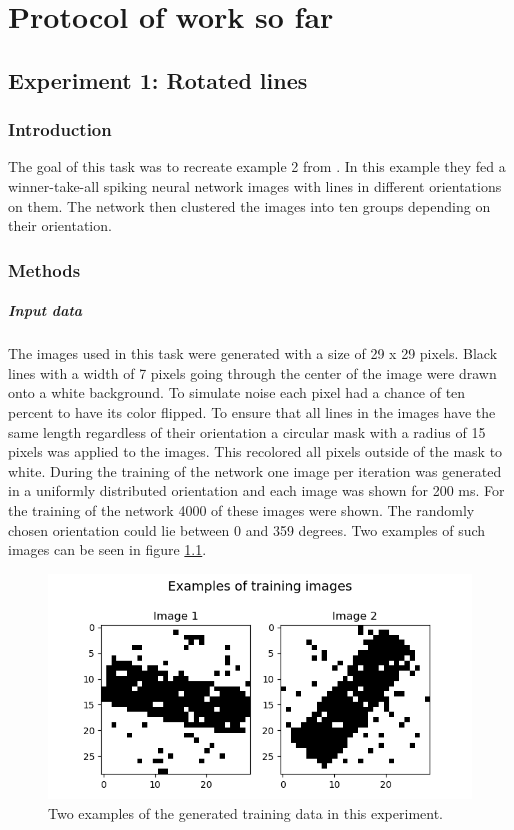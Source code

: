\chapter{Protocol of work so far}
\section{Experiment 1: Rotated lines}

\subsection{Introduction}
The goal of this task was to recreate example 2 from \citet{nessler}. In this example they fed a winner-take-all spiking neural network images with lines in different orientations on them. The network then clustered the images into ten groups depending on their orientation.

\subsection{Methods}
\paragraph{Input data}
The images used in this task were generated with a size of 29 x 29 pixels. Black lines with a width of 7 pixels going through the center of the image were drawn onto a white background. To simulate noise each pixel had a chance of ten percent to have its color flipped. To ensure that all lines in the images have the same length regardless of their orientation a circular mask with a radius of 15 pixels was applied to the images. This recolored all pixels outside of the mask to white. During the training of the network one image per iteration was generated in a uniformly distributed orientation and each image was shown for 200 ms. For the training of the network 4000 of these images were shown. The randomly chosen orientation could lie between 0 and 359 degrees.  Two examples of such images can be seen in figure \ref{fig:angleImages}.

\begin{figure}
  \includegraphics[width=\linewidth]{figures/angleNetwork/trainingImages.png}
  \caption{Two examples of the generated training data in this experiment.}
  \label{fig:angleImages}
\end{figure}

